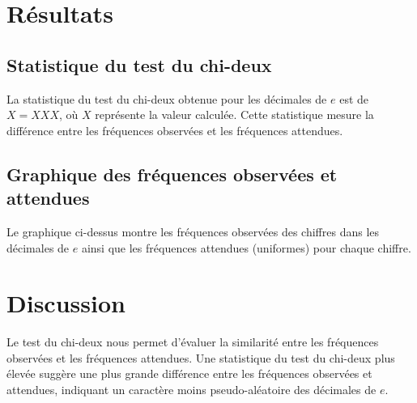 \documentclass{article}
\begin{document}
\section{Résultats}

\subsection{Statistique du test du chi-deux}

La statistique du test du chi-deux obtenue pour les décimales de \(e\) est de \(X = XXX\), où \(X\) représente la valeur calculée. Cette statistique mesure la différence entre les fréquences observées et les fréquences attendues.

\subsection{Graphique des fréquences observées et attendues}

\begin{center}
\begin{tikzpicture}
\end{tikzpicture}
\end{center}

Le graphique ci-dessus montre les fréquences observées des chiffres dans les décimales de \(e\) ainsi que les fréquences attendues (uniformes) pour chaque chiffre.

\section{Discussion}

Le test du chi-deux nous permet d'évaluer la similarité entre les fréquences observées et les fréquences attendues. Une statistique du test du chi-deux plus élevée suggère une plus grande différence entre les fréquences observées et attendues, indiquant un caractère moins pseudo-aléatoire des décimales de \(e\).
\end{document}
